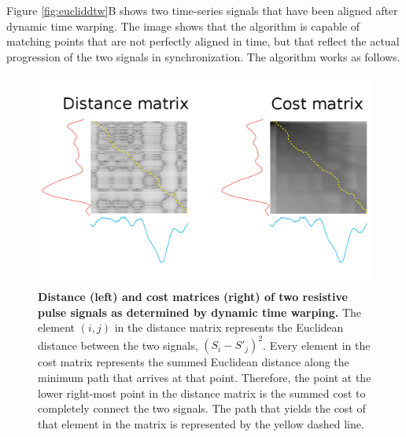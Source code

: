			Figure \ref{fig:eucliddtw}B shows two time-series signals that have been aligned after dynamic time warping. The image shows that the algorithm is capable of matching points that are not perfectly aligned in time, but that reflect the actual progression of the two signals in synchronization. The algorithm works as follows.
			
			\begin{figure}
				\includegraphics[width=\textwidth]{distancecost}
				\caption{\textbf{Distance (left) and cost matrices (right) of two resistive pulse signals as determined by dynamic time warping.} The element $\left(i,j\right)$ in the distance matrix represents the Euclidean distance between the two signals, $\left(S_{i}-S'_{j}\right)^{2}$. Every element in the cost matrix represents the summed Euclidean distance along the minimum path that arrives at that point. Therefore, the point at the lower right-most point in the distance matrix is the summed cost to completely connect the two signals. The path that yields the cost of that element in the matrix is represented by the yellow dashed line.}
				\label{fig:distancecost}
			\end{figure}

